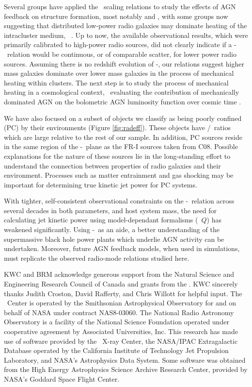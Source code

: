 \documentclass{emulateapj}
\begin{document}
Several groups have applied the \birzan\ scaling relations to study
the effects of AGN feedback on structure formation, most notably
\citet{best07} and \citet{2007MNRAS.379..260M}, with some groups now
suggesting that distributed low-power radio galaxies may dominate
heating of the intracluster medium,
\eg\ \citet{2009arXiv0908.3158H}. Up to now, the available
observational results, which were primarily calibrated to high-power
radio sources, did not clearly indicate if a \pjet-\prad\ relation
would be continuous, or of comparable scatter, for lower power radio
sources. Assuming there is no redshift evolution of \pjet-\prad, our
relations suggest higher mass galaxies dominate over lower mass
galaxies in the process of mechanical heating within clusters. The
next step is to study the process of mechanical heating in a
cosmological context, \eg\ evaluating the contribution of mechanically
dominated AGN on the bolometric AGN luminosity function over cosmic
time \citet{2009MNRAS.395..518C}.

We have also focused on a subset of objects we classify as being
poorly confined (PC) by their environments (Figure
\ref{fig:radeff}). These objects have \pjet/\prad\ ratios which are
large relative to the rest of our sample. In addition, PC sources
reside in the same region of the \pjet-\prad\ plane as the FR-I
sources taken from C08. Possible explanations for the nature of these
sources lie in the long-standing effort to understand the connection
between properties of radio galaxies and their environment. Processes
such as matter entrainment and gas shocking may be important for
determining true kinetic jet power for PC systems.

With tighter, self-consistent observational constraints on the
\pjet-\prad\ relation across several decades in both parameters, and
host system mass, the need for calculating jet kinetic power using
model-dependant formalisms (\ie\ $Q$) has weakened
significantly. Using \pjet-\prad\ as an aide, a better understanding
of the supermassive black hole power plants which underlie AGN
activity can be undertaken. Moreover, future AGN feedback models, when
used in simulations, must replicate the observed radio-mode relations
studied here.

\acknowledgements

KWC and BRM acknowledge generous support from the Natural Science and
Engineering Research Council of Canada and grants from the \cxo. KWC
sincerely thanks Judith Croston, David Rafferty, and Chris Willott for
helpful input. The \cxo\ Center is operated by the Smithsonian
Astrophysical Observatory for and on behalf of NASA under contract
NAS8-03060. The National Radio Astronomy Observatory is a facility of
the National Science Foundation operated under cooperative agreement
by Associated Universities, Inc. This research has made use of
software provided by the \chandra\ X-ray Center, the NASA/IPAC
Extragalactic Database operated by the California Institute of
Technology Jet Propulsion Laboratory, and NASA's Astrophysics Data
System. Some software was obtained from the High Energy Astrophysics
Science Archive Research Center, provided by NASA's Goddard Space
Flight Center.
\end{document}
